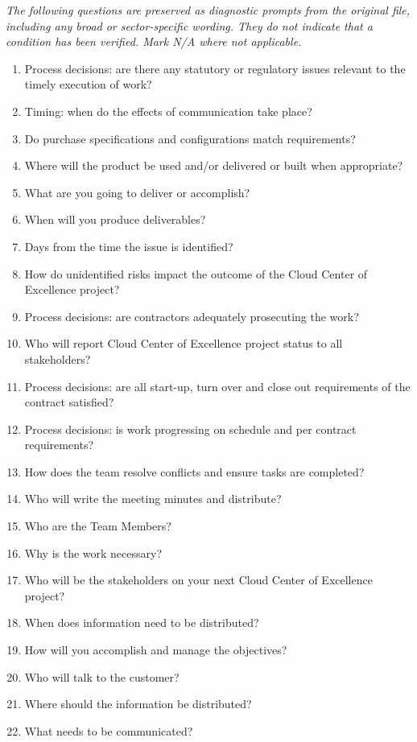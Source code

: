 \documentclass[10pt,letterpaper]{article}
\newcommand{\docsection}[1]{\par\Needspace{5\baselineskip}\vspace{8pt}{\large\sffamily\bfseries\color{navy}#1}\par\vspace{2pt}{\color{rulegrey}\rule{\linewidth}{.6pt}}\par}
\begin{document}
\docsection{03 \quad Source diagnostic checklist}
\textit{The following questions are preserved as diagnostic prompts from the original file, including any broad or sector-specific wording. They do not indicate that a condition has been verified. Mark N/A where not applicable.}
\begingroup\small\begin{enumerate}[leftmargin=2.1em, itemsep=4pt]
\item[1.] Process decisions: are there any statutory or regulatory issues relevant to the timely execution of work?
\item[2.] Timing: when do the effects of communication take place?
\item[3.] Do purchase specifications and configurations match requirements?
\item[4.] Where will the product be used and/or delivered or built when appropriate?
\item[5.] What are you going to deliver or accomplish?
\item[6.] When will you produce deliverables?
\item[7.] Days from the time the issue is identified?
\item[8.] How do unidentified risks impact the outcome of the Cloud Center of Excellence project?
\item[9.] Process decisions: are contractors adequately prosecuting the work?
\item[10.] Who will report Cloud Center of Excellence project status to all stakeholders?
\item[11.] Process decisions: are all start-up, turn over and close out requirements of the contract satisfied?
\item[12.] Process decisions: is work progressing on schedule and per contract requirements?
\item[13.] How does the team resolve conflicts and ensure tasks are completed?
\item[14.] Who will write the meeting minutes and distribute?
\item[15.] Who are the Team Members?
\item[16.] Why is the work necessary?
\item[17.] Who will be the stakeholders on your next Cloud Center of Excellence project?
\item[18.] When does information need to be distributed?
\item[19.] How will you accomplish and manage the objectives?
\item[20.] Who will talk to the customer?
\item[21.] Where should the information be distributed?
\item[22.] What needs to be communicated?
\end{enumerate}\endgroup
\end{document}
